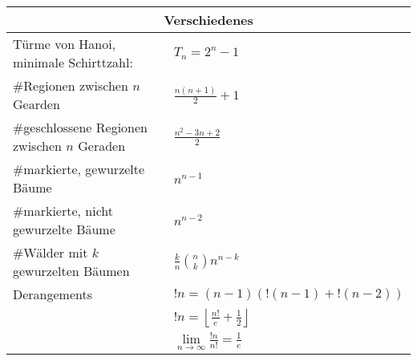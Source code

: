 \begin{tabular}{ll}
	\toprule
	\multicolumn{2}{c}{Verschiedenes} \\
	\midrule
	Türme von Hanoi, minimale Schirttzahl: &
	$T_n = 2^n - 1$ \\

	\#Regionen zwischen $n$ Gearden	&
	$\frac{n\left(n + 1\right)}{2} + 1$ \\

	\#geschlossene Regionen zwischen $n$ Geraden &
	$\frac{n^2 - 3n + 2}{2}$ \\

	\#markierte, gewurzelte Bäume	&
	$n^{n-1}$ \\

	\#markierte, nicht gewurzelte Bäume	&
	$n^{n-2}$ \\

	\#Wälder mit $k$ gewurzelten Bäumen	&
	$\frac{k}{n}\binom{n}{k}n^{n-k}$ \\

	Derangements &
	$!n = (n - 1)(!(n - 1) + !(n - 2))$ \\
	&
	$!n = \left\lfloor\frac{n!}{e} + \frac{1}{2}\right\rfloor$ \\
	&
	$\lim\limits_{n \to \infty} \frac{!n}{n!} = \frac{1}{e}$ \\
	\bottomrule
\end{tabular}

% 
